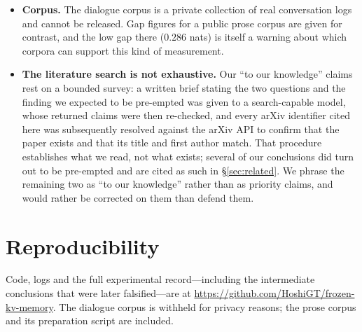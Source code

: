 \documentclass[11pt]{article}
\begin{document}
\begin{itemize}
StreamingLLM require no training step and no corpus, while our module is trained
on the evaluation domain and is domain-specific. The table says what a small
learned component buys at a fixed budget; it does not say those policies are
badly designed, and a deployment that cannot train on its own traffic is one
where they win by default. We also do not report the decomposition of
\S\ref{sec:decomposition} for eviction methods.
\item \textbf{Corpus.} The dialogue corpus is a private collection of real
conversation logs and cannot be released. Gap figures for a public prose corpus
are given for contrast, and the low gap there ($0.286$ nats) is itself a warning
about which corpora can support this kind of measurement.
\item \textbf{The literature search is not exhaustive.} Our ``to our knowledge''
claims rest on a bounded survey: a written brief stating the two questions and
the finding we expected to be pre-empted was given to a search-capable model,
whose returned claims were then re-checked, and every arXiv identifier cited here
was subsequently resolved against the arXiv API to confirm that the paper exists
and that its title and first author match. That procedure establishes what we
read, not what exists; several of our conclusions did turn out to be
pre-empted and are cited as such in \S\ref{sec:related}. We phrase the remaining
two as ``to our knowledge'' rather than as priority claims, and would rather be
corrected on them than defend them.
\end{itemize}

\section*{Reproducibility}

Code, logs and the full experimental record---including the intermediate
conclusions that were later falsified---are at
\url{https://github.com/HoshiGT/frozen-kv-memory}. The dialogue corpus is
withheld for privacy reasons; the prose corpus and its preparation script are
included.



\end{document}
